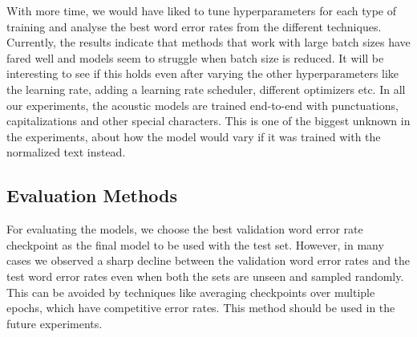 With more time, we would have liked to tune hyperparameters for each type of training and analyse the best word error rates from the different techniques. Currently, the results indicate that methods that work with large batch sizes have fared well and models seem to struggle when batch size is reduced. It will be interesting to see if this holds even after varying the other hyperparameters like the learning rate, adding a learning rate scheduler, different optimizers etc. In all our experiments, the acoustic models are trained end-to-end with punctuations, capitalizations and other special characters. This is one of the biggest unknown in the experiments, about how the model would vary if it was trained with the normalized text instead. 

\subsection{Evaluation Methods}
For evaluating the models, we choose the best validation word error rate checkpoint as the final model to be used with the test set. However, in many cases we observed a sharp decline between the validation word error rates and the test word error rates even when both the sets are unseen and sampled randomly. This can be avoided by techniques like averaging checkpoints over multiple epochs, which have competitive error rates. This method should be used in the future experiments.